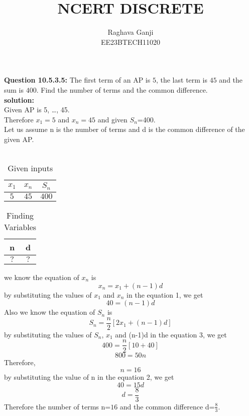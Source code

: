 \documentclass[12pt]{article}
\title{NCERT DISCRETE}
\author{Raghava Ganji\\EE23BTECH11020}
\date{}
\begin{document}
\maketitle
\textbf{Question 10.5.3.5:}
The first term of an AP is $5$, the last term is $45$ and the sum is $400$. Find the number of terms and the common difference.\\
\textbf{solution:}\\
Given AP is 5, \ldots, 45.\\
Therefore $x_1=5$ and $x_n=45$ and given $S_n$=400.\\
Let us assume n is the number of terms and d is the common difference of the given AP.\\\\
\begin{table}[H]
\centering
\begin{tabular}{|c|c|c|}\hline
$x_1$ & $x_n$ & $S_n$\\ \hline
$5$ & $45$ & $400$\\ \hline
\end{tabular}
\caption{Given inputs}
\end{table}
\begin{table}[H]
\centering
\begin{tabular}{|c|c|}\hline
n & d\\ \hline
$?$ &$?$\\ \hline
\end{tabular}
\caption{Finding Variables}
\end{table}
we know the equation of $x_n$ is
\begin{equation}
\tag{1}
x_n=x_1+(n-1)d
\end{equation}
by substituting the values of $x_1$ and $x_n$ in the equation 1, we get
\begin{equation}
\tag{2}
40=(n-1)d
\end{equation}
Also we know the equation of $S_n$ is
\begin{equation}
\tag{3}
S_n=\frac{n}{2} [2x_1+(n-1)d]
\end{equation}
by substituting the values of $S_n$, $x_1$ and (n-1)d in the equation 3, we get
\begin{equation}
\tag{4}
400=\frac{n}{2} [10+40]
\end{equation}
\begin{equation}
\tag{5}
800=50n
\end{equation}
Therefore,
\begin{equation}
\tag{6}
n=16
\end{equation}
by substituting the value of n in the equation 2, we get
\begin{equation}
\tag{7}
40=15d
\end{equation}
\begin{equation}
\tag{8}
d=\frac{8}{3}
\end{equation}
Therefore the number of terms n=$16$ and the common difference d=$\frac{8}{3}$.
\end{document}
